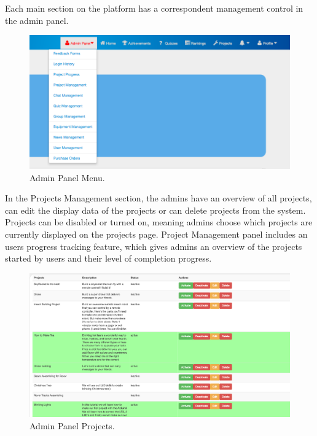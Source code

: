 Each main section on the platform has a correspondent management control in the admin panel.

\begin{figure}
\includegraphics[width=1\linewidth]{images/ui/AdminPanelMenu.png}
\caption{Admin Panel Menu.}
\label{fig:AdminPanelMenu}
\end{figure} 

In the Projects Management section, the admins have an overview of all projects, can edit the display data of the projects or can delete projects from the system. Projects can be
disabled or turned on, meaning admins choose which projects are currently displayed on the projects page. 
Project Management panel includes an users progress tracking feature, which gives admins an overview of the projects started by users and their level of completion progress.
\\

\begin{figure}
\includegraphics[width=1\linewidth]{images/ui/AdminPanelProjects.png}
\caption{Admin Panel Projects.}
\label{fig:AdminPanelProjects}
\end{figure} 

